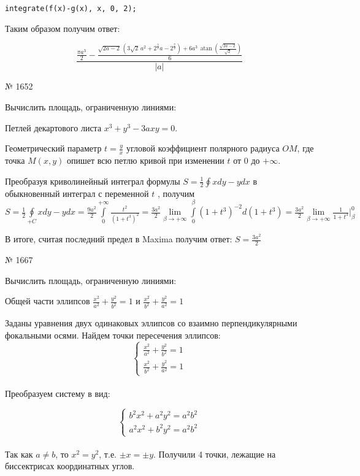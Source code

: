 \documentclass[article, bachelor, och, pract]{SCWorks}
\begin{document}
\begin{itemize}
\texttt{integrate(f(x)-g(x), x, 0, 2);}

Таким образом получим ответ:

\[\frac{\frac{\ensuremath{\pi} {{a}^{3}}}{2}-\frac{\sqrt{2a-2}\,\left( 3\sqrt{2}\,{{a}^{2}}+{{2}^{\frac{3}{2}}}a-{{2}^{\frac{7}{2}}}\right) +6{{a}^{3}}\,\operatorname{atan}\left( \frac{\sqrt{2a-2}}{\sqrt{2}}\right) }{6}}{\left| a\right| }\]

№ 1652

Вычислить площадь, ограниченную линиями:

Петлей декартового листа $x^3+y^3-3axy=0$. 

Геометрический параметр $t=\frac{y}{x}$ угловой коэффициент полярного радиуса $OM$, где точка $M(x, y)$ опишет всю петлю кривой при изменении $t$ от $0$ до $+\infty$.

Преобразуя криволинейный интеграл формулы $S=\frac{1}{2}\oint xdy-ydx$ в обыкновенный интеграл с переменной $t$ , получим $S=\frac{1}{2}\oint\limits_{+C} xdy-ydx = \frac{9a^2}{2}\int\limits_{0}^{+\infty}\frac{t^2}{(1+t^3)^2}=\frac{3a^2}{2}\lim\limits_{\beta \to +\infty}\int\limits_{0}^{\beta}(1+t^3)^{-2}d(1+t^3)=\frac{3a^2}{2}\lim\limits_{\beta \to +\infty}\frac{1}{1+t^3}|_{\beta}^{0}$

В итоге, считая последний предел в Maxima получим ответ: $S=\frac{3a^2}{2}$

№ 1667

Вычислить площадь, ограниченную линиями:

Общей части эллипсов $\frac{x^2}{a^2}+\frac{y^2}{b^2}=1$ и $\frac{x^2}{b^2}+\frac{y^2}{a^2}=1$

Заданы уравнения двух одинаковых эллипсов со взаимно перпендикулярными фокальными осями. Найдем точки пересечения эллипсов:
$$
\left\{
\begin{array}{l}
\frac{x^2}{a^2}+\frac{y^2}{b^2}=1 \\
\frac{x^2}{b^2}+\frac{y^2}{a^2}=1
\end{array} \right. 
$$\\

Преобразуем систему в вид:

$$
\left\{
\begin{array}{l}
b^2x^2+a^2y^2=a^2b^2 \\
a^2x^2+b^2y^2=a^2b^2
\end{array} \right. 
$$\\

Так как $a\ne b$, то $x^2=y^2$, т.е. $\pm x= \pm y$. Получили 4 точки, лежащие на биссектрисах координатных углов. 


\end{itemize}
\end{document}
